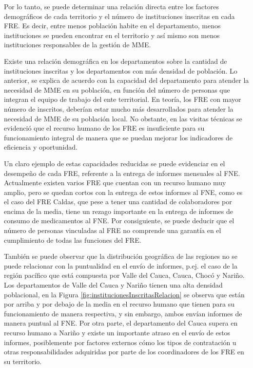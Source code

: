 \documentclass[
  oneside]{book}
\begin{document}
Por lo tanto, se puede determinar una relación directa entre los factores demográficos de cada territorio y el número de instituciones inscritas en cada FRE. Es decir, entre menos población habite en el departamento, menos instituciones se pueden encontrar en el territorio y así mismo son menos instituciones responsables de la gestión de MME.

Existe una relación demográfica en los departamentos sobre la cantidad de instituciones inscritas y los departamentos con más densidad de población. Lo anterior, se explica de acuerdo con la capacidad del departamento para atender la necesidad de MME en su población, en función del número de personas que integran el equipo de trabajo del ente territorial. En teoría, los FRE con mayor número de inscritos, deberían estar mucho más desarrollados para atender la necesidad de MME de su población local. No obstante, en las visitas técnicas se evidenció que el recurso humano de los FRE es insuficiente para su funcionamiento integral de manera que se puedan mejorar los indicadores de eficiencia y oportunidad.

Un claro ejemplo de estas capacidades reducidas se puede evidenciar en el desempeño de cada FRE, referente a la entrega de informes mensuales al FNE. Actualmente existen varios FRE que cuentan con un recurso humano muy amplio, pero se quedan cortos con la entrega de estos informes al FNE, como es el caso del FRE Caldas, que pese a tener una cantidad de colaboradores por encima de la media, tiene un rezago importante en la entrega de informes de consumo de medicamentos al FNE. Por consiguiente, se puede deducir que el número de personas vinculadas al FRE no comprende una garantía en el cumplimiento de todas las funciones del FRE.

También se puede observar que la distribución geográfica de las regiones no se puede relacionar con la puntualidad en el envío de informes, p.ej. el caso de la región pacífico que está compuesta por Valle del Cauca, Cauca, Chocó y Nariño. Los departamentos de Valle del Cauca y Nariño tienen una alta densidad poblacional, en la Figura \ref{fig:institucionesInscritasRelacion} se observa que están por arriba y por debajo de la media en el recurso humano que tienen para su funcionamiento de manera respectiva, y sin embargo, ambos envían informes de manera puntual al FNE. Por otra parte, el departamento del Cauca supera en recurso humano a Nariño y existe un importante atraso en el envío de estos informes, posiblemente por factores externos cómo los tipos de contratación u otras responsabilidades adquiridas por parte de los coordinadores de los FRE en su territorio.
\end{document}
